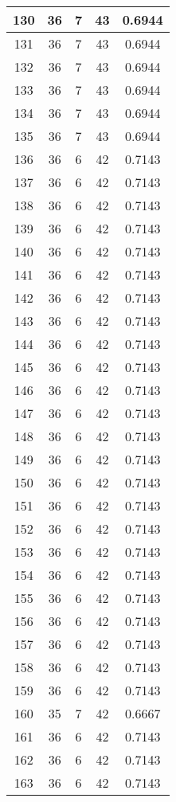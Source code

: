\documentclass[letterpaper, 12pt]{article}
\begin{document}
\begin{longtable}{|c|c|c|c|c|}
\hline
130 & 36 & 7 & 43 & 0.6944 \\
\hline
131 & 36 & 7 & 43 & 0.6944 \\
\hline
132 & 36 & 7 & 43 & 0.6944 \\
\hline
133 & 36 & 7 & 43 & 0.6944 \\
\hline
134 & 36 & 7 & 43 & 0.6944 \\
\hline
135 & 36 & 7 & 43 & 0.6944 \\
\hline
136 & 36 & 6 & 42 & 0.7143 \\
\hline
137 & 36 & 6 & 42 & 0.7143 \\
\hline
138 & 36 & 6 & 42 & 0.7143 \\
\hline
139 & 36 & 6 & 42 & 0.7143 \\
\hline
140 & 36 & 6 & 42 & 0.7143 \\
\hline
141 & 36 & 6 & 42 & 0.7143 \\
\hline
142 & 36 & 6 & 42 & 0.7143 \\
\hline
143 & 36 & 6 & 42 & 0.7143 \\
\hline
144 & 36 & 6 & 42 & 0.7143 \\
\hline
145 & 36 & 6 & 42 & 0.7143 \\
\hline
146 & 36 & 6 & 42 & 0.7143 \\
\hline
147 & 36 & 6 & 42 & 0.7143 \\
\hline
148 & 36 & 6 & 42 & 0.7143 \\
\hline
149 & 36 & 6 & 42 & 0.7143 \\
\hline
150 & 36 & 6 & 42 & 0.7143 \\
\hline
151 & 36 & 6 & 42 & 0.7143 \\
\hline
152 & 36 & 6 & 42 & 0.7143 \\
\hline
153 & 36 & 6 & 42 & 0.7143 \\
\hline
154 & 36 & 6 & 42 & 0.7143 \\
\hline
155 & 36 & 6 & 42 & 0.7143 \\
\hline
156 & 36 & 6 & 42 & 0.7143 \\
\hline
157 & 36 & 6 & 42 & 0.7143 \\
\hline
158 & 36 & 6 & 42 & 0.7143 \\
\hline
159 & 36 & 6 & 42 & 0.7143 \\
\hline
160 & 35 & 7 & 42 & 0.6667 \\
\hline
161 & 36 & 6 & 42 & 0.7143 \\
\hline
162 & 36 & 6 & 42 & 0.7143 \\
\hline
163 & 36 & 6 & 42 & 0.7143 \\

\end{longtable}
\end{document}
